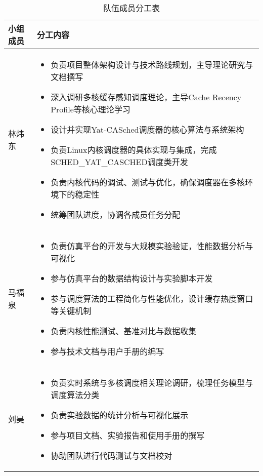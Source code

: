 \begin{table}[H]
\centering
\begin{tabular}{p{2.5cm} p{11cm}}
\toprule
\textbf{小组成员} & \textbf{分工内容} \\
\midrule
林炜东 &
\begin{itemize}
    \item 负责项目整体架构设计与技术路线规划，主导理论研究与文档撰写
    \item 深入调研多核缓存感知调度理论，主导Cache Recency Profile等核心理论学习
    \item 设计并实现Yat-CASched调度器的核心算法与系统架构
    \item 负责Linux内核调度器的具体实现与集成，完成SCHED\_YAT\_CASCHED调度类开发
    \item 负责内核代码的调试、测试与优化，确保调度器在多核环境下的稳定性
    \item 统筹团队进度，协调各成员任务分配
\end{itemize}
\\
\midrule
马福泉 &
\begin{itemize}
    \item 负责仿真平台的开发与大规模实验验证，性能数据分析与可视化
    \item 参与仿真平台的数据结构设计与实验脚本开发
    \item 参与调度算法的工程简化与性能优化，设计缓存热度窗口等关键机制
    \item 负责内核性能测试、基准对比与数据收集
    \item 参与技术文档与用户手册的编写
\end{itemize}
\\
\midrule
刘昊 &
\begin{itemize}
    \item 负责实时系统与多核调度相关理论调研，梳理任务模型与调度算法分类
    \item 负责实验数据的统计分析与可视化展示
    \item 参与项目文档、实验报告和使用手册的撰写
    \item 协助团队进行代码测试与文档校对
\end{itemize}
\\
\bottomrule
\end{tabular}
\caption{队伍成员分工表}
\label{tab:team-division}
\end{table}